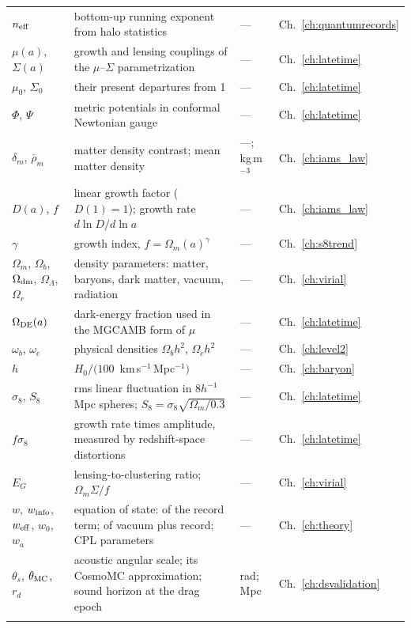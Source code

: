 {\begin{longtable}{@{}>{\raggedright\arraybackslash}p{}>{\raggedright\arraybackslash}p{}>{\raggedright\arraybackslash}p{}>{\raggedright\arraybackslash}p{}@{}}
$n_{\rm eff}$ & bottom-up running exponent from halo statistics & --- & Ch.~\ref{ch:quantumrecords}\\\iamrowrule
$\mu(a)$, $\Sigma(a)$ & growth and lensing couplings of the $\mu$--$\Sigma$ parametrization & --- & Ch.~\ref{ch:latetime}\\\iamrowrule
$\mu_0$, $\Sigma_0$ & their present departures from 1 & --- & Ch.~\ref{ch:latetime}\\\iamrowrule
$\Phi$, $\Psi$ & metric potentials in conformal Newtonian gauge & --- & Ch.~\ref{ch:latetime}\\\iamrowrule
$\delta_m$, $\bar\rho_m$ & matter density contrast; mean matter density & ---; kg\,m$^{-3}$ & Ch.~\ref{ch:iams_law}\\\iamrowrule
$D(a)$, $f$ & linear growth factor ($D(1)=1$); growth rate $d\ln D/d\ln a$ & --- & Ch.~\ref{ch:iams_law}\\\iamrowrule
$\gamma$ & growth index, $f=\Omega_m(a)^\gamma$ & --- & Ch.~\ref{ch:s8trend}\\\iamrowrule
$\Omega_m$, $\Omega_b$, $\Omega_{\rm dm}$, $\Omega_\Lambda$, $\Omega_r$ & density parameters: matter, baryons, dark matter, vacuum, radiation & --- & Ch.~\ref{ch:virial}\\\iamrowrule
$\Omega_{\rm DE}(a)$ & dark-energy fraction used in the MGCAMB form of $\mu$ & --- & Ch.~\ref{ch:latetime}\\\iamrowrule
$\omega_b$, $\omega_c$ & physical densities $\Omega_bh^2$, $\Omega_ch^2$ & --- & Ch.~\ref{ch:level2}\\\iamrowrule
$h$ & $H_0/(100$~km\,s$^{-1}$\,Mpc$^{-1})$ & --- & Ch.~\ref{ch:baryon}\\\iamrowrule
$\sigma_8$, $S_8$ & rms linear fluctuation in $8h^{-1}$\,Mpc spheres; $S_8=\sigma_8\sqrt{\Omega_m/0.3}$ & --- & Ch.~\ref{ch:latetime}\\\iamrowrule
$f\sigma_8$ & growth rate times amplitude, measured by redshift-space distortions & --- & Ch.~\ref{ch:latetime}\\\iamrowrule
$E_G$ & lensing-to-clustering ratio; $\Omega_m\Sigma/f$ & --- & Ch.~\ref{ch:virial}\\\iamrowrule
$w$, $w_{\rm info}$, $w_{\rm eff}$, $w_0$, $w_a$ & equation of state: of the record term; of vacuum plus record; CPL parameters & --- & Ch.~\ref{ch:theory}\\\iamrowrule
$\theta_s$, $\theta_{\rm MC}$, $r_d$ & acoustic angular scale; its CosmoMC approximation; sound horizon at the drag epoch & rad; Mpc & Ch.~\ref{ch:dsvalidation}\\\iamrowrule

\end{longtable}}
